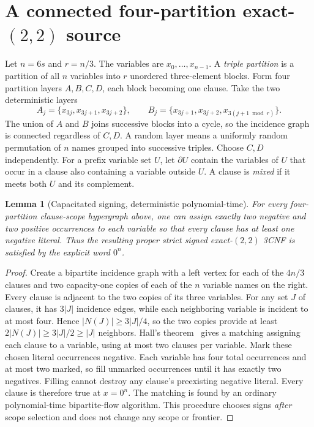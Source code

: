 \documentclass[11pt]{article}
\newtheorem{lemma}[theorem]{Lemma}
\begin{document}
\section{A connected four-partition exact-$(2,2)$ source}
Let $n=6s$ and $r=n/3$. The variables are $x_0,\ldots,x_{n-1}$. A \emph{triple partition} is a partition of all $n$ variables into $r$ unordered three-element blocks. Form four partition layers $A,B,C,D$, each block becoming one clause. Take the two deterministic layers
\[
 A_j=\{x_{3j},x_{3j+1},x_{3j+2}\},\qquad
 B_j=\{x_{3j+1},x_{3j+2},x_{3(j+1\bmod r)}\}.
\]
The union of $A$ and $B$ joins successive blocks into a cycle, so the incidence graph is connected regardless of $C,D$. A random layer means a uniformly random permutation of $n$ names grouped into successive triples. Choose $C,D$ independently. For a prefix variable set $U$, let $\partial U$ contain the variables of $U$ that occur in a clause also containing a variable outside $U$. A clause is \emph{mixed} if it meets both $U$ and its complement.

\begin{lemma}[Capacitated signing, deterministic polynomial-time]
For \emph{every} four-partition clause-scope hypergraph above, one can assign exactly two negative and two positive occurrences to each variable so that every clause has at least one negative literal. Thus the resulting proper strict signed exact-$(2,2)$ 3CNF is satisfied by the explicit word $0^n$.
\end{lemma}
\begin{proof}
Create a bipartite incidence graph with a left vertex for each of the $4n/3$ clauses and two capacity-one copies of each of the $n$ variable names on the right. Every clause is adjacent to the two copies of its three variables. For any set $J$ of clauses, it has $3|J|$ incidence edges, while each neighboring variable is incident to at most four. Hence $|N(J)|\ge3|J|/4$, so the two copies provide at least $2|N(J)|\ge3|J|/2\ge|J|$ neighbors. Hall's theorem~\cite{hall1935} gives a matching assigning each clause to a variable, using at most two clauses per variable. Mark these chosen literal occurrences negative. Each variable has four total occurrences and at most two marked, so fill unmarked occurrences until it has exactly two negatives. Filling cannot destroy any clause's preexisting negative literal. Every clause is therefore true at $x=0^n$. The matching is found by an ordinary polynomial-time bipartite-flow algorithm. This procedure chooses signs \emph{after} scope selection and does not change any scope or frontier.
\end{proof}
\end{document}
